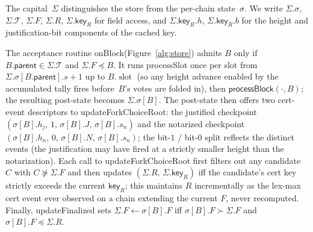\documentclass{article}
\newcommand{\T}[0]{\ensuremath{\mathcal{T}}}
\newcommand{\slot}[0]{\ensuremath{\operatorname{\mathrm{slot}}}}
\newcommand{\parent}{\mathsf{parent}}
\newcommand{\key}{\mathsf{key}}
\newcommand{\processSlot}{\textsf{processSlot}\xspace}
\newcommand{\processBlock}{\textsf{processBlock}\xspace}
\newcommand{\onBlock}{\textsf{onBlock}\xspace}
\newcommand{\updateForkChoiceRoot}{\textsf{updateForkChoiceRoot}\xspace}
\newcommand{\updateFinalized}{\textsf{updateFinalized}\xspace}
\theoremstyle{plain}
\theoremstyle{definition}
\theoremstyle{remark}
\begin{document}
The capital~$\Sigma$ distinguishes the store from the per-chain state~$\sigma$.
We write $\Sigma.\sigma$, $\Sigma.\T$, $\Sigma.F$, $\Sigma.R$, $\Sigma.\key_R$ for field access, and $\Sigma.\key_R.h$, $\Sigma.\key_R.b$ for the height and justification-bit components of the cached key.

The acceptance routine \onBlock (Figure~\ref{alg:store}) admits $B$ only if $B.\parent \in \Sigma.\T$ and $\Sigma.F \preceq B$.
It runs \processSlot once per slot from $\Sigma.\sigma[B.\parent].s + 1$ up to $B.\slot$ (so any height advance enabled by the accumulated tally fires before~$B$'s votes are folded in), then $\processBlock(\cdot, B)$; the resulting post-state becomes $\Sigma.\sigma[B]$.
The post-state then offers two cert-event descriptors to \updateForkChoiceRoot: the justified checkpoint $(\sigma[B].h_j,\, 1,\, \sigma[B].J,\, \sigma[B].s_n)$ and the notarized checkpoint $(\sigma[B].h_n,\, 0,\, \sigma[B].N,\, \sigma[B].s_n)$; the bit-$1$ / bit-$0$ split reflects the distinct events (the justification may have fired at a strictly smaller height than the notarization).
Each call to \updateForkChoiceRoot first filters out any candidate~$C$ with $C \not\succeq \Sigma.F$ and then updates $(\Sigma.R,\, \Sigma.\key_R)$ iff the candidate's cert key strictly exceeds the current $\key_R$; this maintains $R$ incrementally as the lex-max cert event ever observed on a chain extending the current $F$, never recomputed.
Finally, \updateFinalized sets $\Sigma.F \gets \sigma[B].F$ iff $\sigma[B].F \succ \Sigma.F$ and $\sigma[B].F \preceq \Sigma.R$.
\end{document}
